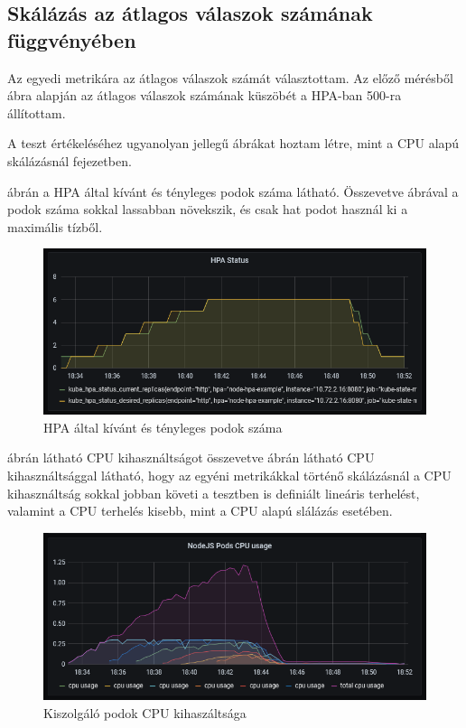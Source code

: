 \documentclass[a4paper,oneside]{article}
\begin{document}
\subsection{Skálázás az átlagos válaszok számának függvényében}
\label{secsec:custom_scaling}

Az egyedi metrikára az átlagos válaszok számát választottam.  Az előző mérésből
 ábra alapján az átlagos válaszok számának
küszöbét a HPA-ban 500-ra állítottam.

A teszt értékeléséhez ugyanolyan jellegű  ábrákat hoztam létre, mint a CPU alapú
skálázásnál  fejezetben.

 ábrán a HPA által kívánt és tényleges podok száma
látható.  Összevetve  ábrával a podok száma sokkal lassabban
növekszik, és csak hat podot használ ki a maximális tízből.

\begin{figure}[H]
  \centering
  \includegraphics[width=\textwidth]{light_custom_hpa.PNG}
  \caption{HPA által kívánt és tényleges podok száma}
  \label{light_custom_hpa}  
\end{figure}

 ábrán látható CPU kihasználtságot összevetve
 ábrán látható CPU kihasználtsággal látható, hogy az egyéni
metrikákkal történő skálázásnál a CPU kihasználtság sokkal jobban követi a
tesztben is definiált lineáris terhelést, valamint a CPU terhelés kisebb, mint a
CPU alapú slálázás esetében.

\begin{figure}[H]
  \centering
  \includegraphics[width=\textwidth]{light_custom_cpu.PNG}
  \caption{Kiszolgáló podok CPU kihaszáltsága}
  \label{light_custom_cpu}  
\end{figure}
\end{document}
